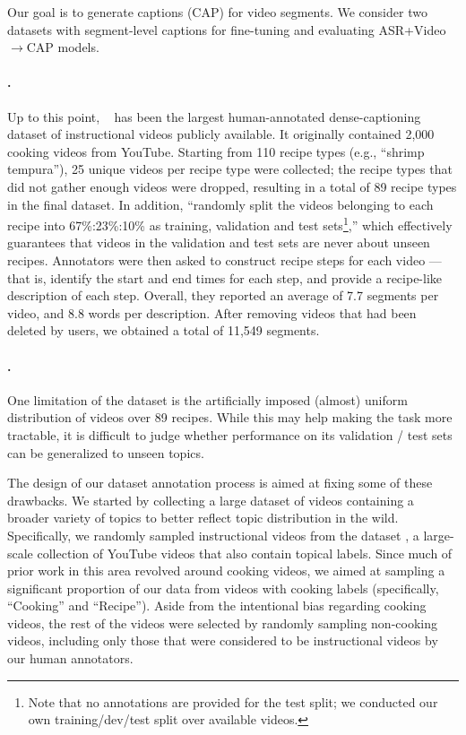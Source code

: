 \documentclass[11pt,a4paper]{article}
\begin{document}
Our goal is to generate captions (CAP) for video segments. We consider two datasets with segment-level captions for fine-tuning and evaluating ASR+Video$\to$CAP models. 



\paragraph{\youcook.} Up to this point, \youcook~\citep{zhou2018towards} has been the largest human-annotated dense-captioning dataset of instructional videos publicly available.  It originally contained 2,000 cooking videos from YouTube.
Starting from 110 recipe types (e.g., ``shrimp tempura''), 25 unique videos per recipe type were collected; the recipe types that did not gather enough videos were dropped, resulting in a total of 89 recipe types in the final dataset. In addition,  ``randomly split the videos belonging to each recipe into 67\%:23\%:10\% as training, validation and test sets\footnote{Note that no annotations are provided for the test split; we conducted our own training/dev/test split over available videos.},'' which effectively guarantees that videos in the validation and test sets are never about unseen recipes.  
Annotators were then asked to construct recipe steps for each video --- that is, identify the start and end times for each step, and provide a recipe-like description of each step.
Overall, they reported an average of 7.7 segments per video, and 8.8 words per description.  
After removing videos that had been deleted by users, we obtained a total of 11,549 segments.



\paragraph{\ldvm.} One limitation of the \youcook dataset is the artificially imposed (almost) uniform distribution of videos over 89 recipes.  While this may help making the task more tractable, 
it is difficult to judge whether performance on its validation / test sets can be generalized to unseen topics.

The design of our \ldvm dataset annotation process is aimed at fixing some of these drawbacks.
We started by collecting a large dataset of videos containing a broader variety of topics to better reflect topic distribution in the wild.
Specifically, we randomly sampled instructional videos from the \ytdata dataset \citep{abu2016youtube}, a large-scale collection of YouTube videos that also contain topical labels.
Since much of prior work in this area revolved around cooking videos, we aimed at sampling a significant proportion of our data from videos with cooking labels (specifically, ``Cooking'' and ``Recipe'').
Aside from the intentional bias regarding cooking videos, the rest of the videos were selected by randomly sampling non-cooking videos, including only those that were considered to be instructional videos by our human annotators.
\end{document}

